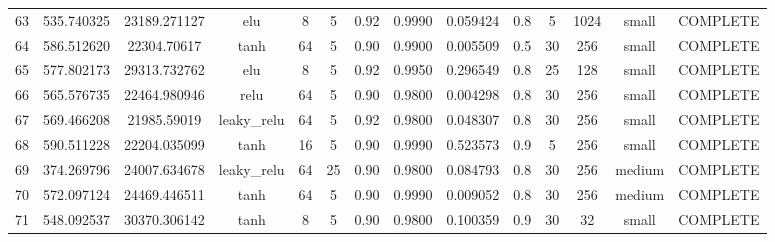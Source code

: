 \begin{longtable}{cccccccccccccc}
                       63 &                 535.740325 &                       23189.271127 &             elu &           8 &              5 &        0.92 & 0.9990 &       0.059424 &             0.8 &                  5 &     1024 &     small & COMPLETE \\
                       64 &                 586.512620 &                        22304.70617 &            tanh &          64 &              5 &        0.90 & 0.9900 &       0.005509 &             0.5 &                 30 &      256 &     small & COMPLETE \\
                       65 &                 577.802173 &                       29313.732762 &             elu &           8 &              5 &        0.92 & 0.9950 &       0.296549 &             0.8 &                 25 &      128 &     small & COMPLETE \\
                       66 &                 565.576735 &                       22464.980946 &            relu &          64 &              5 &        0.90 & 0.9800 &       0.004298 &             0.8 &                 30 &      256 &     small & COMPLETE \\
                       67 &                 569.466208 &                        21985.59019 &     leaky\_relu &          64 &              5 &        0.92 & 0.9800 &       0.048307 &             0.8 &                 30 &      256 &     small & COMPLETE \\
                       68 &                 590.511228 &                       22204.035099 &            tanh &          16 &              5 &        0.90 & 0.9990 &       0.523573 &             0.9 &                  5 &      256 &     small & COMPLETE \\
                       69 &                 374.269796 &                       24007.634678 &     leaky\_relu &          64 &             25 &        0.90 & 0.9800 &       0.084793 &             0.8 &                 30 &      256 &    medium & COMPLETE \\
                       70 &                 572.097124 &                       24469.446511 &            tanh &          64 &              5 &        0.90 & 0.9990 &       0.009052 &             0.8 &                 30 &      256 &    medium & COMPLETE \\
                       71 &                 548.092537 &                       30370.306142 &            tanh &           8 &              5 &        0.90 & 0.9800 &       0.100359 &             0.9 &                 30 &       32 &     small & COMPLETE \\

\end{longtable}

